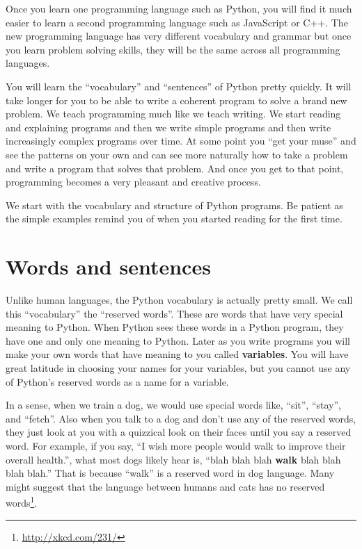 Once you learn one programming language such as Python, you will 
find it much easier to learn a second programming language such
as JavaScript or C++.  The new programming language has very different 
vocabulary and grammar but once you learn problem solving skills, 
they will be the same across all programming languages.

You will learn the ``vocabulary'' and ``sentences'' of Python pretty quickly.
It will take longer for you to be able to write a coherent program
to solve a brand new problem.  We teach programming much like we teach
writing.  We start reading and explaining programs and then we write 
simple programs and then write increasingly complex programs over time.
At some point you ``get your muse'' and see the patterns on your own
and can see more naturally how to take a problem and 
write a program that solves that problem.  And once you get 
to that point, programming becomes a very pleasant and creative process.  

We start with the vocabulary and structure of Python programs.  Be patient
as the simple examples remind you of when you started reading for the first
time. 

\section{Words and sentences}

Unlike human languages, the Python vocabulary is actually pretty small.
We call this ``vocabulary'' the ``reserved words''.  These are words that
have very special meaning to Python.  When Python sees these words in 
a Python program, they have one and only one meaning to Python.  Later
as you write programs you will make your own words that have meaning to 
you called {\bf variables}.   You will have great latitude in choosing
your names for your variables, but you cannot use any of Python's 
reserved words as a name for a variable.

In a sense, when we train a dog, we would use special words like,
``sit'', ``stay'', and ``fetch''.  Also when you talk to a dog and
don't use any of the reserved words, they just look at you with a 
quizzical look on their faces until you say a reserved word.  
For example, if you say, 
``I wish more people would walk to improve their overall health.'', 
what most dogs likely hear is,
``blah blah blah {\bf walk} blah blah blah blah.''
That is because ``walk'' is a reserved word in dog language.  Many
might suggest that the language between humans and cats has no
reserved words\footnote{\url{http://xkcd.com/231/}}.

